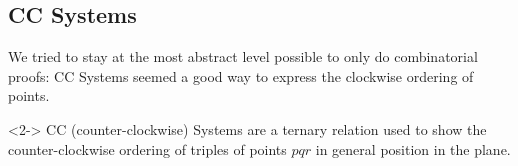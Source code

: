 \documentclass[18pt]{beamer}
\begin{document}
\subsection{CC Systems}

\begin{frame}
 
 We tried to stay at the most abstract level possible to only do combinatorial proofs: CC Systems seemed a good way to express the clockwise ordering of points.
 
 \begin{definition}<2->
  CC (counter-clockwise) Systems are a ternary relation used to show the counter-clockwise ordering of triples of points $pqr$ in general position in the plane.
 \end{definition}
 

\end{frame}
\end{document}

